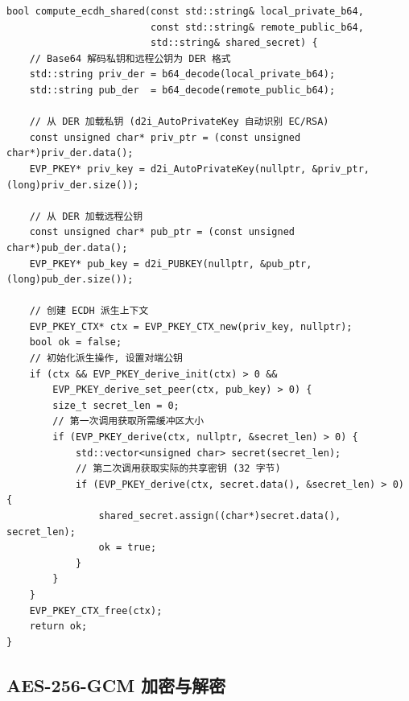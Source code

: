 \documentclass[12pt]{article}
\begin{document}
\begin{lstlisting}[caption={ECDH 共享密钥推导 (utils.cpp)},label={lst:ecdh-compute}]
bool compute_ecdh_shared(const std::string& local_private_b64,
                         const std::string& remote_public_b64,
                         std::string& shared_secret) {
    // Base64 解码私钥和远程公钥为 DER 格式
    std::string priv_der = b64_decode(local_private_b64);
    std::string pub_der  = b64_decode(remote_public_b64);

    // 从 DER 加载私钥 (d2i_AutoPrivateKey 自动识别 EC/RSA)
    const unsigned char* priv_ptr = (const unsigned char*)priv_der.data();
    EVP_PKEY* priv_key = d2i_AutoPrivateKey(nullptr, &priv_ptr, (long)priv_der.size());

    // 从 DER 加载远程公钥
    const unsigned char* pub_ptr = (const unsigned char*)pub_der.data();
    EVP_PKEY* pub_key = d2i_PUBKEY(nullptr, &pub_ptr, (long)pub_der.size());

    // 创建 ECDH 派生上下文
    EVP_PKEY_CTX* ctx = EVP_PKEY_CTX_new(priv_key, nullptr);
    bool ok = false;
    // 初始化派生操作, 设置对端公钥
    if (ctx && EVP_PKEY_derive_init(ctx) > 0 &&
        EVP_PKEY_derive_set_peer(ctx, pub_key) > 0) {
        size_t secret_len = 0;
        // 第一次调用获取所需缓冲区大小
        if (EVP_PKEY_derive(ctx, nullptr, &secret_len) > 0) {
            std::vector<unsigned char> secret(secret_len);
            // 第二次调用获取实际的共享密钥 (32 字节)
            if (EVP_PKEY_derive(ctx, secret.data(), &secret_len) > 0) {
                shared_secret.assign((char*)secret.data(), secret_len);
                ok = true;
            }
        }
    }
    EVP_PKEY_CTX_free(ctx);
    return ok;
}
\end{lstlisting}

\subsection{AES-256-GCM 加密与解密}
\end{document}
